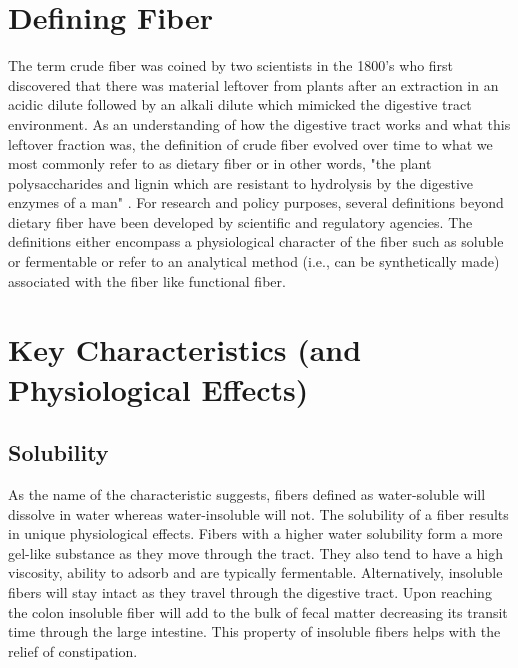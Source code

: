 \documentclass{tufte-handout}
\begin{document}
\section*{Defining Fiber}
The term crude fiber was coined by two scientists in the 1800’s who first discovered that there was material leftover from plants after an extraction in an acidic dilute followed by an alkali dilute which mimicked the digestive tract environment. As an understanding of how the digestive tract works and what this leftover fraction was, the definition of crude fiber evolved over time to what we most commonly refer to as dietary fiber or in other words, "the plant polysaccharides and lignin which are resistant to hydrolysis by the digestive enzymes of a man" \citep{Trowell1978}. For research and policy purposes, several definitions beyond dietary fiber have been developed by scientific and regulatory agencies. The definitions either encompass a physiological character of the fiber such as soluble or fermentable or refer to an analytical method (i.e., can be synthetically made) associated with the fiber like functional fiber.

\section{Key Characteristics (and Physiological Effects)}

\subsection{Solubility}
As the name of the characteristic suggests, fibers defined as water-soluble will dissolve in water whereas water-insoluble will not. The solubility of a fiber results in unique physiological effects. Fibers with a higher water solubility form a more gel-like substance as they move through the tract. They also tend to have a high viscosity, ability to adsorb and are typically fermentable. Alternatively, insoluble fibers will stay intact as they travel through the digestive tract. Upon reaching the colon insoluble fiber will add to the bulk of fecal matter decreasing its transit time through the large intestine. This property of insoluble fibers helps with the relief of constipation.
\end{document}
